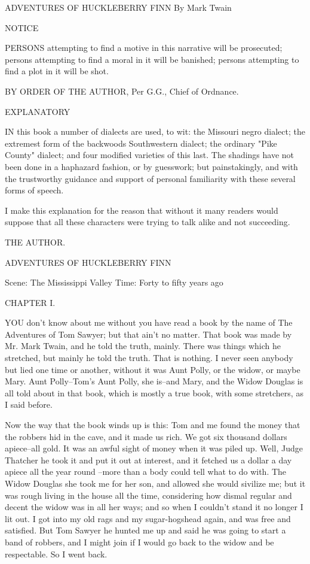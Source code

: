 
ADVENTURES OF HUCKLEBERRY FINN
By Mark Twain

NOTICE

PERSONS attempting to find a motive in this narrative will be prosecuted;
persons attempting to find a moral in it will be banished; persons
attempting to find a plot in it will be shot.

BY ORDER OF THE AUTHOR, Per G.G., Chief of Ordnance.


EXPLANATORY

IN this book a number of dialects are used, to wit:  the Missouri negro
dialect; the extremest form of the backwoods Southwestern dialect; the
ordinary "Pike County" dialect; and four modified varieties of this last.
The shadings have not been done in a haphazard fashion, or by guesswork;
but painstakingly, and with the trustworthy guidance and support of
personal familiarity with these several forms of speech.

I make this explanation for the reason that without it many readers would
suppose that all these characters were trying to talk alike and not
succeeding.

THE AUTHOR.

ADVENTURES OF HUCKLEBERRY FINN

Scene:  The Mississippi Valley Time:  Forty to fifty years ago

CHAPTER I.

YOU don't know about me without you have read a book by the name of The
Adventures of Tom Sawyer; but that ain't no matter.  That book was made
by Mr. Mark Twain, and he told the truth, mainly.  There was things which
he stretched, but mainly he told the truth.  That is nothing.  I never
seen anybody but lied one time or another, without it was Aunt Polly, or
the widow, or maybe Mary.  Aunt Polly--Tom's Aunt Polly, she is--and
Mary, and the Widow Douglas is all told about in that book, which is
mostly a true book, with some stretchers, as I said before.

Now the way that the book winds up is this:  Tom and me found the money
that the robbers hid in the cave, and it made us rich.  We got six
thousand dollars apiece--all gold.  It was an awful sight of money when
it was piled up.  Well, Judge Thatcher he took it and put it out at
interest, and it fetched us a dollar a day apiece all the year round
--more than a body could tell what to do with.  The Widow Douglas she took
me for her son, and allowed she would sivilize me; but it was rough
living in the house all the time, considering how dismal regular and
decent the widow was in all her ways; and so when I couldn't stand it no
longer I lit out.  I got into my old rags and my sugar-hogshead again,
and was free and satisfied.  But Tom Sawyer he hunted me up and said he
was going to start a band of robbers, and I might join if I would go back
to the widow and be respectable.  So I went back.

